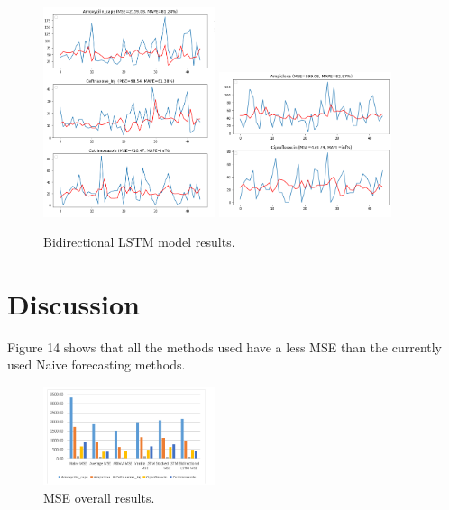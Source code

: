 \documentclass[12pt]{report}
\begin{document}
\begin{figure}[H]%
\begin {center}
\includegraphics[width=0.45\textwidth]{images/bi (5).png}
\includegraphics[width=0.45\textwidth]{images/bi (6).png}
\caption{Bidirectional LSTM model results.}
\label{fig:ecg}
\end {center}
\end{figure}




\chapter{Discussion}

Figure 14 shows that all the methods used have a less MSE than the currently used Naive forecasting methods.\\
\begin{figure}[H]%
\begin {center}
\includegraphics[width=0.45\textwidth]{images/chart.png}
\caption{MSE overall results.}
\label{fig:ecg}
\end {center}
\end{figure}
\end{document}
